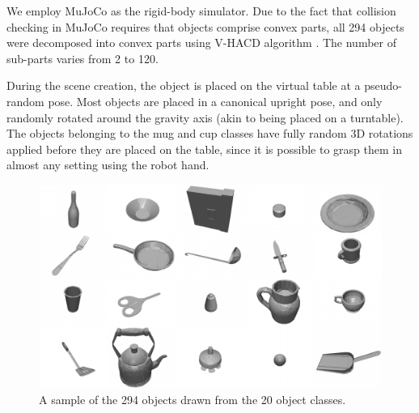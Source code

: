 We employ MuJoCo \cite{MuJoCo} as the rigid-body simulator. Due to the fact that collision checking in MuJoCo requires that objects comprise convex parts, all 294 objects were decomposed into convex parts using V-HACD algorithm \cite{V-HACD}. The number of sub-parts varies from 2 to 120.

During the scene creation, the object is placed on the virtual table at a pseudo-random pose. Most objects are placed in a canonical upright pose, and only randomly rotated around the gravity axis (akin to being placed on a turntable). The objects belonging to the mug and cup classes have fully random 3D rotations applied before they are placed on the table, since it is possible to grasp them in almost any setting using the robot hand.

\begin{figure}
  \includegraphics[width=\linewidth]{images/allObjects-small.pdf}
  \caption{A sample of the 294 objects drawn from the 20 object classes.
  \label{fig:allObjects}}
\end{figure}

